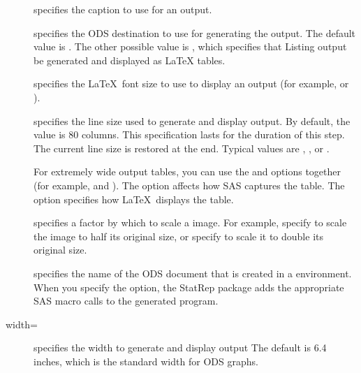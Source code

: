 \documentclass[article,oneside]{memoir}
\newcommand*{\StatRep}{\textsf{StatRep}\xspace}
\begin{document}
  \begin{description}
     \item[] specifies the caption to use for an output.

     \item[] specifies the ODS destination to use for generating the output.
     The default value is . The other possible value is , which
     specifies that Listing output be generated and displayed as LaTeX tables.

     \item[] specifies the \LaTeX\ font size to use to display an output
    (for example,  or ).

     \item[] specifies the line size used to generate and display
      output. By default, the value is 80 columns.
     This specification lasts for the duration of this step. The current line size is
     restored at the end.
     Typical values are , , or .

     For extremely wide output tables, you can use the  and 
     options together (for example,  and ).
     The  option affects how SAS captures the table. The 
     option specifies how \LaTeX\ displays the table.%

     \item[] specifies a factor by which to scale a  image.
     For example, specify  to scale the image to half its original size,
     or specify  to scale it to double its original size.

    \item[] specifies the name of the ODS document that is created in a
      environment. When you specify the  option,
     the \StatRep package adds the appropriate SAS macro calls to the
     generated program.

     \item[width=] specifies the width to generate and display  output
           The default is 6.4 inches, which is the standard width for ODS graphs.

  \end{description}
\end{document}
